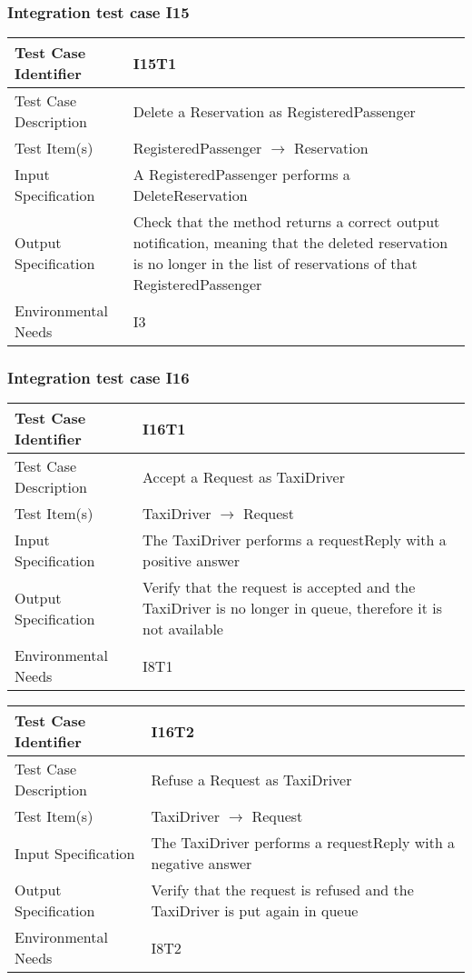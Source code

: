 		\subsubsection{Integration test case I15}
		\begin{center}
			\begin{tabular}{ |l p{10cm}| } \hline
				Test Case Identifier & I15T1 \\ \hline
				Test Case Description & Delete a Reservation as RegisteredPassenger \\ \hline
				Test Item(s) & RegisteredPassenger $\rightarrow$ Reservation \\ \hline
				Input Specification & A RegisteredPassenger performs a DeleteReservation\\ \hline
				Output Specification & Check that the method returns a correct output notification, meaning that the deleted reservation is no longer in the
				list of reservations of that RegisteredPassenger \\ \hline
				Environmental Needs & I3 \\ \hline
			\end{tabular}
		\end{center}
		\subsubsection{Integration test case I16}
		\begin{center}
			\begin{tabular}{ |l p{10cm}| } \hline
				Test Case Identifier & I16T1 \\ \hline
				Test Case Description & Accept a Request as TaxiDriver \\ \hline
				Test Item(s) & TaxiDriver $\rightarrow$ Request \\ \hline
				Input Specification & The TaxiDriver performs a requestReply with a positive answer  \\ \hline
				Output Specification & Verify that the request is accepted and the TaxiDriver is no longer in queue, therefore it is not available \\ \hline
				Environmental Needs & I8T1 \\ \hline
			\end{tabular}
			\begin{tabular}{ |l p{10cm}| } \hline
				Test Case Identifier & I16T2 \\ \hline
				Test Case Description & Refuse a Request as TaxiDriver \\ \hline
				Test Item(s) & TaxiDriver $\rightarrow$ Request \\ \hline
				Input Specification & The TaxiDriver performs a requestReply with a negative answer \\ \hline
				Output Specification & Verify that the request is refused and the TaxiDriver is put again in queue \\ \hline
				Environmental Needs & I8T2 \\ \hline
			\end{tabular}
		\end{center}
